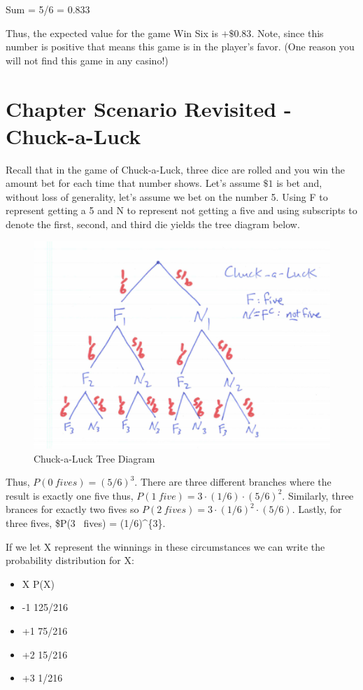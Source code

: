 \documentclass[]{book}
\providecommand{\tightlist}{%
  \setlength{\itemsep}{0pt}\setlength{\parskip}{0pt}}
\theoremstyle{definition}
\theoremstyle{definition}
\theoremstyle{definition}
\theoremstyle{remark}
\begin{document}
Sum = 5/6 = 0.833

Thus, the expected value for the game Win Six is \(+\$0.83\). Note,
since this number is positive that means this game is in the player's
favor. (One reason you will not find this game in any casino!)

\section{Chapter Scenario Revisited -
Chuck-a-Luck}\label{chapter_scenario_revisited_chuckaluck}

Recall that in the game of Chuck-a-Luck, three dice are rolled and you
win the amount bet for each time that number shows. Let's assume \(\$1\)
is bet and, without loss of generality, let's assume we bet on the
number 5. Using F to represent getting a 5 and N to represent not
getting a five and using subscripts to denote the first, second, and
third die yields the tree diagram below.

\begin{figure}

{\centering \includegraphics[width=0.3\linewidth]{01-basics-figures/chuck_a_luck_tree_diagram} 

}

\caption{Chuck-a-Luck Tree Diagram}\label{fig:nice-fig-82}
\end{figure}

Thus, \(P(0 \ fives) = (5/6)^{3}\). There are three different branches
where the result is exactly one five thus,
\(P(1 \ five) = 3 \cdot (1/6) \cdot (5/6)^{2}\). Similarly, three
brances for exactly two fives so
\(P(2 \ fives) = 3 \cdot (1/6)^{2} \cdot (5/6)\). Lastly, for three
fives, \$P(3 ~fives) = (1/6)\^{}\{3\}.

If we let X represent the winnings in these circumstances we can write
the probability distribution for X:

\begin{itemize}
\tightlist
\item
  X P(X)
\item
  -1 125/216
\item
  +1 75/216
\item
  +2 15/216
\item
  +3 1/216
\end{itemize}
\end{document}

